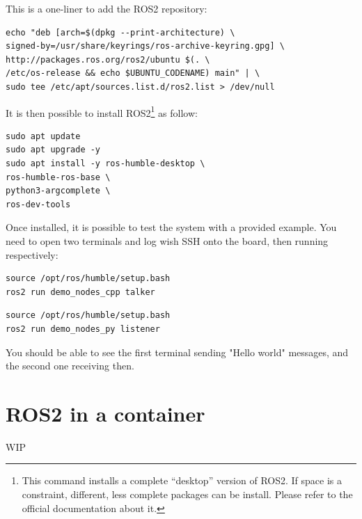 \documentclass[10pt]{article}
\begin{document}
This is a one-liner to add the ROS2 repository:

\begin{tcolorbox}
\begin{verbatim}
echo "deb [arch=$(dpkg --print-architecture) \
signed-by=/usr/share/keyrings/ros-archive-keyring.gpg] \
http://packages.ros.org/ros2/ubuntu $(. \
/etc/os-release && echo $UBUNTU_CODENAME) main" | \
sudo tee /etc/apt/sources.list.d/ros2.list > /dev/null
\end{verbatim}
\end{tcolorbox}

It is then possible to install ROS2\footnote{This command installs a complete ``desktop'' version of ROS2. If space is a constraint, different, less complete packages can be install. Please refer to the official documentation about it.} as follow:

\begin{tcolorbox}
\begin{verbatim}
sudo apt update
sudo apt upgrade -y
sudo apt install -y ros-humble-desktop \
ros-humble-ros-base \
python3-argcomplete \
ros-dev-tools
\end{verbatim}
\end{tcolorbox}

Once installed, it is possible to test the system with a provided example. You need to open two terminals and log wish SSH onto the board, then running respectively:

\begin{tcolorbox}
\begin{verbatim}
source /opt/ros/humble/setup.bash
ros2 run demo_nodes_cpp talker
\end{verbatim}
\end{tcolorbox}



\begin{tcolorbox}
\begin{verbatim}
source /opt/ros/humble/setup.bash
ros2 run demo_nodes_py listener
\end{verbatim}
\end{tcolorbox}


You should be able to see the first terminal sending "Hello world" messages, and the second one receiving then.

\section{ROS2 in a container}
\label{sec:ros2-container}
WIP
\end{document}
